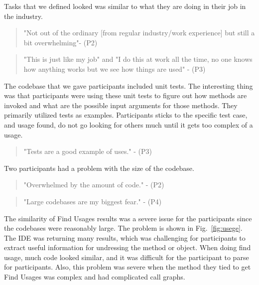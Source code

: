 \documentclass[conference]{IEEEtran}
\begin{document}
Tasks that we defined looked was similar to what they are doing in their job in the industry. 
\begin{quote}
"Not out of the ordinary [from regular industry/work experience] but still a bit overwhelming"- (P2)
\end{quote}
\begin{quote} "This is just like my job" and "I do this at work all the time, no one knows how anything works but we see how things are used"
- (P3)
\end{quote}
The codebase that we gave participants included unit tests. The interesting thing was that participants were using these unit tests to figure out how methods are invoked and what are the possible input arguments for those methods. They primarily utilized tests as examples. Participants sticks to the specific test case, and usage found, do not go looking for others much until it gets too complex of a usage.

\begin{quote} "Tests are a good example of uses." - (P3)\end{quote}
Two participants had a problem with the size of the codebase.
\begin{quote}"Overwhelmed by the amount of code." - (P2) \end{quote}
\begin{quote}"Large codebases are my biggest fear." - (P4) \end{quote}
The similarity of Find Usages results was a severe issue for the participants since the codebases were reasonably large. The problem is shown in Fig.~\ref{fig:usege}. The IDE was returning many results, which was challenging for participants to extract useful information for undressing the method or object. When doing find usage, much code looked similar, and it was difficult for the participant to parse for participants. Also, this problem was severe when the method they tied to get Find Usages was complex and had complicated call graphs.
\end{document}
